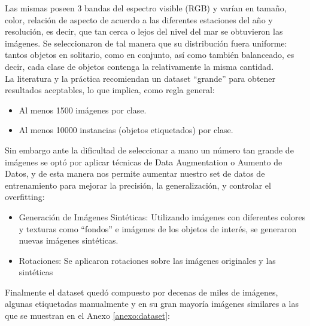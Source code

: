Las mismas poseen 3 bandas del espectro visible (RGB) y varían en tamaño, color, relación de aspecto de acuerdo a las diferentes estaciones del año y resolución, es decir, que tan cerca o lejos del nivel del mar se obtuvieron las imágenes. Se seleccionaron de tal manera que su distribución fuera uniforme: tantos objetos en solitario, como en conjunto, así como también balanceado, es decir, cada clase de objetos contenga la relativamente la misma cantidad.\\ 

La literatura y la práctica recomiendan un dataset “grande” para obtener resultados aceptables, lo que implica, como regla general:
\begin{itemize}
    \item Al menos 1500 imágenes por clase.
    \item Al menos 10000 instancias (objetos etiquetados) por clase.
\end{itemize}

Sin embargo ante la dificultad de seleccionar a mano un número tan grande de imágenes se optó por aplicar técnicas de Data Augmentation o Aumento de Datos, y de esta manera nos permite aumentar nuestro set de datos de entrenamiento para mejorar la precisión, la generalización, y controlar el overfitting:
\begin{itemize}
    \item Generación de Imágenes Sintéticas: Utilizando imágenes con diferentes colores y texturas como ``fondos'' e imágenes de los objetos de interés, se generaron nuevas imágenes sintéticas.
    \item Rotaciones: Se aplicaron rotaciones sobre las imágenes originales y las sintéticas
\end{itemize}

Finalmente el dataset quedó compuesto por decenas de miles de imágenes, algunas etiquetadas manualmente y en su gran mayoría imágenes similares a las que se muestran en el Anexo \ref{anexo:dataset}:

\newpage
